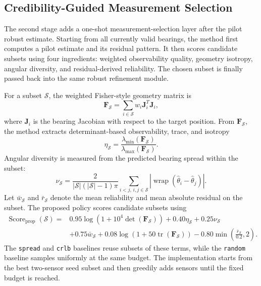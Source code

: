 \documentclass[preprint,12pt]{elsarticle}
\begin{document}
\subsection{Credibility-Guided Measurement Selection}

The second stage adds a one-shot measurement-selection layer after the pilot robust estimate. Starting from all currently valid bearings, the method first computes a pilot estimate and its residual pattern. It then scores candidate subsets using four ingredients: weighted observability quality, geometry isotropy, angular diversity, and residual-derived reliability. The chosen subset is finally passed back into the same robust refinement module.

For a subset $\mathcal{S}$, the weighted Fisher-style geometry matrix is
\begin{equation}
\mathbf{F}_{\mathcal{S}}=\sum_{i\in\mathcal{S}} w_i \mathbf{J}_i^T \mathbf{J}_i,
\end{equation}
where $\mathbf{J}_i$ is the bearing Jacobian with respect to the target position. From $\mathbf{F}_{\mathcal{S}}$, the method extracts determinant-based observability, trace, and isotropy
\begin{equation}
\eta_{\mathcal{S}}=\frac{\lambda_{\min}(\mathbf{F}_{\mathcal{S}})}{\lambda_{\max}(\mathbf{F}_{\mathcal{S}})}.
\end{equation}
Angular diversity is measured from the predicted bearing spread within the subset:
\begin{equation}
\nu_{\mathcal{S}}=\frac{2}{|\mathcal{S}|(|\mathcal{S}|-1)\pi}\sum_{i<j,\, i,j\in\mathcal{S}}
\left|\operatorname{wrap}\!\left(\hat{\theta}_i-\hat{\theta}_j\right)\right|.
\end{equation}
Let $\bar{w}_{\mathcal{S}}$ and $\bar{r}_{\mathcal{S}}$ denote the mean reliability and mean absolute residual on the subset. The proposed policy scores candidate subsets using
\begin{equation}
\begin{aligned}
\operatorname{Score}_{\text{prop}}(\mathcal{S}) ={}& 0.95 \log\!\left(1+10^{4}\det(\mathbf{F}_{\mathcal{S}})\right)
+ 0.40 \eta_{\mathcal{S}}
+ 0.25 \nu_{\mathcal{S}} \\
&+ 0.75 \bar{w}_{\mathcal{S}}
+ 0.08 \log\!\left(1+50 \operatorname{tr}(\mathbf{F}_{\mathcal{S}})\right)
- 0.80 \min\!\left(\frac{\bar{r}_{\mathcal{S}}}{0.2}, 2\right).
\end{aligned}
\end{equation}
The \texttt{spread} and \texttt{crlb} baselines reuse subsets of these terms, while the \texttt{random} baseline samples uniformly at the same budget. The implementation starts from the best two-sensor seed subset and then greedily adds sensors until the fixed budget is reached.
\end{document}
